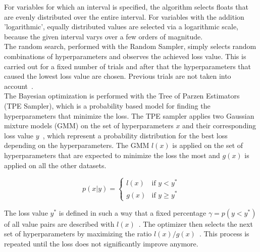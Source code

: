 
For variables for which an interval is specified, the algorithm selects floats that are evenly distributed over the entire interval. For variables with the addition
'logarithmic', equally distributed values are selected via a logarithmic scale, because the given interval varys over a few orders of magnitude. \\

The random search, performed with the Random Sampler, simply selects random combinations of hyperparameters and observes the achieved loss value. This is carried out for a fixed number of trials and after that the
hyperparameters that caused the lowest loss value are chosen. Previous trials are not taken into account~\cite{hpalg:2011}. \\

The Bayesian optimization is performed with the Tree of Parzen Estimators (TPE Sampler), which is a probability based model for finding the hyperparameters that minimize the loss.
The TPE sampler applies two Gaussian mixture models (GMM) on the set of hyperparameters $x$ and their corresponding loss value $y$~\cite{hpsearch:2012}, which represent a probability distribution for the best
loss depending on the hyperparameters. The GMM $l(x)$ is applied on the set of hyperparameters that are expected to minimize the loss the most and $g(x)$ is applied on all the other datasets. 

\[
p(x|y) =
\left\{
\begin{array}{ll}
    l(x) & \text{if } y < y^* \\
    g(x)  & \text{if } y \geq y^*
\end{array}
\right.
\]

The loss value $y^*$ is defined in such a way that a fixed percentage $\gamma = p(y < y^*)$ of all value pairs are described with $l(x)$~\cite{hpalg:2011}.
The optimizer then selects the next set of hyperparameters by maximizing the ratio $l(x)/g(x)$~\cite{hpsearch:2012}. This process is repeated until the loss does not significantly improve anymore.